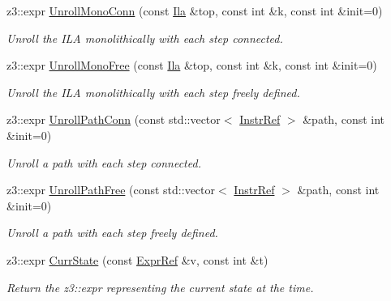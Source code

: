 \begin{DoxyCompactItemize}
z3\+::expr \mbox{\hyperlink{classilang_1_1_ila_z3_unroller_a4cdac1e3cade637c63d80a4ff9a12fba}{Unroll\+Mono\+Conn}} (const \mbox{\hyperlink{classilang_1_1_ila}{Ila}} \&top, const int \&k, const int \&init=0)
\begin{DoxyCompactList}\small\item\em Unroll the I\+LA monolithically with each step connected. \end{DoxyCompactList}\item 
z3\+::expr \mbox{\hyperlink{classilang_1_1_ila_z3_unroller_a23819d20550eca42d6083420b741aa12}{Unroll\+Mono\+Free}} (const \mbox{\hyperlink{classilang_1_1_ila}{Ila}} \&top, const int \&k, const int \&init=0)
\begin{DoxyCompactList}\small\item\em Unroll the I\+LA monolithically with each step freely defined. \end{DoxyCompactList}\item 
z3\+::expr \mbox{\hyperlink{classilang_1_1_ila_z3_unroller_aee34e9bf670b6321f735e10294c79462}{Unroll\+Path\+Conn}} (const std\+::vector$<$ \mbox{\hyperlink{classilang_1_1_instr_ref}{Instr\+Ref}} $>$ \&path, const int \&init=0)
\begin{DoxyCompactList}\small\item\em Unroll a path with each step connected. \end{DoxyCompactList}\item 
z3\+::expr \mbox{\hyperlink{classilang_1_1_ila_z3_unroller_a78106021b04582a5064b72f2d9b55df9}{Unroll\+Path\+Free}} (const std\+::vector$<$ \mbox{\hyperlink{classilang_1_1_instr_ref}{Instr\+Ref}} $>$ \&path, const int \&init=0)
\begin{DoxyCompactList}\small\item\em Unroll a path with each step freely defined. \end{DoxyCompactList}\item 
\mbox{\label{classilang_1_1_ila_z3_unroller_a8cecc83a1af405fbcba8c1df5995a5a9}} 
z3\+::expr \mbox{\hyperlink{classilang_1_1_ila_z3_unroller_a8cecc83a1af405fbcba8c1df5995a5a9}{Curr\+State}} (const \mbox{\hyperlink{classilang_1_1_expr_ref}{Expr\+Ref}} \&v, const int \&t)
\begin{DoxyCompactList}\small\item\em Return the z3\+::expr representing the current state at the time. \end{DoxyCompactList}\item 

\end{DoxyCompactItemize}
